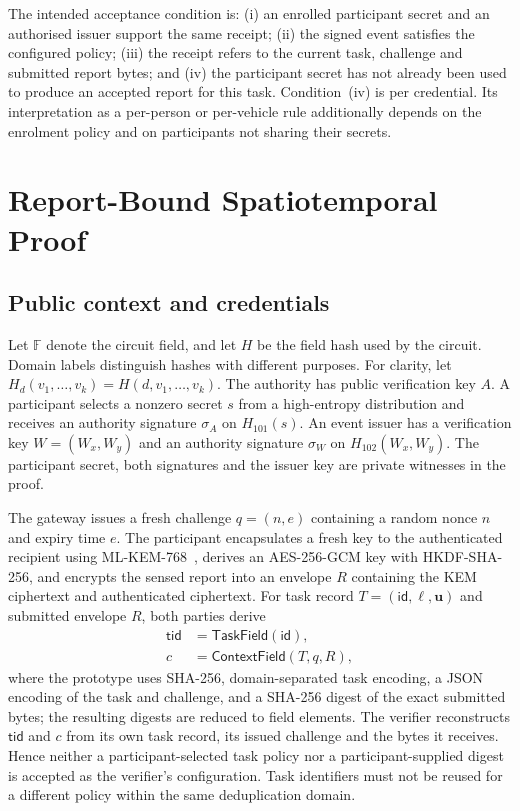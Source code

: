 \documentclass[pdflatex,iicol,sn-mathphys-num]{sn-jnl}
\begin{document}
The intended acceptance condition is: (i) an enrolled participant secret and an authorised issuer support the same receipt; (ii) the signed event satisfies the configured policy; (iii) the receipt refers to the current task, challenge and submitted report bytes; and (iv) the participant secret has not already been used to produce an accepted report for this task. Condition~(iv) is per credential. Its interpretation as a per-person or per-vehicle rule additionally depends on the enrolment policy and on participants not sharing their secrets.

\section{Report-Bound Spatiotemporal Proof}
\label{sec:protocol}

\subsection{Public context and credentials}
\label{sec:context}

Let $\mathbb F$ denote the circuit field, and let $H$ be the field hash used by the circuit. Domain labels distinguish hashes with different purposes. For clarity, let $H_d(v_1,\ldots,v_k)=H(d,v_1,\ldots,v_k)$. The authority has public verification key $A$. A participant selects a nonzero secret $s$ from a high-entropy distribution and receives an authority signature $\sigma_A$ on $H_{101}(s)$. An event issuer has a verification key $W=(W_x,W_y)$ and an authority signature $\sigma_W$ on $H_{102}(W_x,W_y)$. The participant secret, both signatures and the issuer key are private witnesses in the proof.

The gateway issues a fresh challenge $q=(n,e)$ containing a random nonce $n$ and expiry time $e$. The participant encapsulates a fresh key to the authenticated recipient using ML-KEM-768~\citep{NIST2024MLKEM}, derives an AES-256-GCM key with HKDF-SHA-256, and encrypts the sensed report into an envelope $R$ containing the KEM ciphertext and authenticated ciphertext. For task record $T=(\mathsf{id},\boldsymbol{\ell},\boldsymbol u)$ and submitted envelope $R$, both parties derive
\begin{align}
 \mathsf{tid}&=\mathsf{TaskField}(\mathsf{id}),\\
 c&=\mathsf{ContextField}(T,q,R),
\end{align}
where the prototype uses SHA-256, domain-separated task encoding, a JSON encoding of the task and challenge, and a SHA-256 digest of the exact submitted bytes; the resulting digests are reduced to field elements. The verifier reconstructs $\mathsf{tid}$ and $c$ from its own task record, its issued challenge and the bytes it receives. Hence neither a participant-selected task policy nor a participant-supplied digest is accepted as the verifier's configuration. Task identifiers must not be reused for a different policy within the same deduplication domain.
\end{document}
